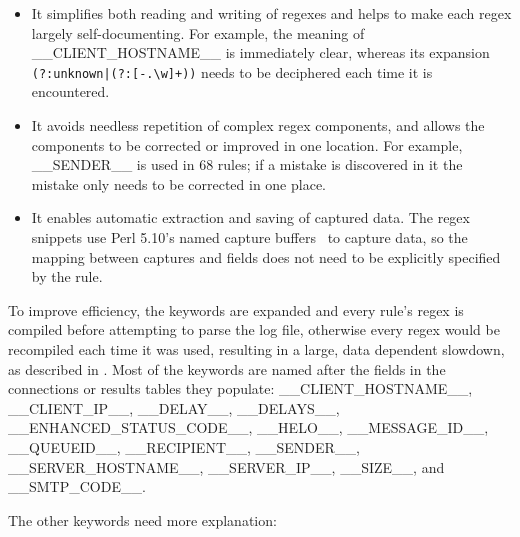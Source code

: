 \begin{itemize}

    \item It simplifies both reading and writing of regexes and helps to
        make each regex largely self-documenting.  For example, the meaning
        of \_\_CLIENT\_HOSTNAME\_\_ is immediately clear, whereas its
        expansion \verb!(?:unknown|(?:[-.\w]+))! needs to be deciphered
        each time it is encountered.

    \item It avoids needless repetition of complex regex components, and
        allows the components to be corrected or improved in one location.
        For example, \_\_SENDER\_\_ is used in 68 rules; if a mistake is
        discovered in it the mistake only needs to be corrected in one
        place.

    \item It enables automatic extraction and saving of captured data.  The
        regex snippets use Perl 5.10's named capture buffers~\cite{perlre}
        to capture data, so the mapping between captures and fields does
        not need to be explicitly specified by the rule.

\end{itemize}

To improve efficiency, the keywords are expanded and every rule's regex is
compiled before attempting to parse the log file, otherwise every regex
would be recompiled each time it was used, resulting in a large, data
dependent slowdown, as described in .
Most of the keywords are named after the fields in the connections or
results tables they populate: \_\_CLIENT\_HOSTNAME\_\_, \_\_CLIENT\_IP\_\_,
\_\_DELAY\_\_, \_\_DELAYS\_\_, \_\_ENHANCED\_STATUS\_CODE\_\_,
\_\_HELO\_\_, \_\_MESSAGE\_ID\_\_, \newline{} \_\_QUEUEID\_\_,
\_\_RECIPIENT\_\_, \_\_SENDER\_\_, \_\_SERVER\_HOSTNAME\_\_,
\_\_SERVER\_IP\_\_, \_\_SIZE\_\_, and \_\_SMTP\_CODE\_\_.

The other keywords need more explanation:

